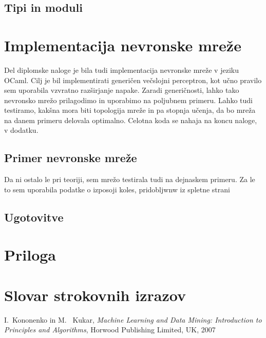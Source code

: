 \documentclass[mat1]{fmfdelo}
\begin{document}
\subsection{Tipi in moduli}


\section{Implementacija nevronske mreže}
Del diplomske naloge je bila tudi implementacija nevronske mreže v jeziku OCaml. Cilj je bil implementirati generičen večslojni perceptron, kot učno pravilo sem uporabila vzvratno razširjanje napake. Zaradi generičnosti, lahko tako nevronsko mrežo prilagodimo in uporabimo na poljubnem primeru. Lahko tudi testiramo, kakšna mora biti topologija mreže in pa stopnja učenja, da bo mreža na danem primeru delovala optimalno. Celotna koda se nahaja na koncu naloge, v dodatku.

\subsection{Primer nevronske mreže}
Da ni ostalo le pri teoriji, sem mrežo testirala tudi na dejnaskem primeru. Za le to sem uporabila podatke o izposoji koles, pridobljwnw iz spletne strani %

\subsection{Ugotovitve}

\section{Priloga} 

\section*{Slovar strokovnih izrazov}

\geslo{}{}
\geslo{}{}

\begin{thebibliography}{99}

I.~Kononenko in M.~ Kukar, \emph{Machine Learning and Data Mining: Introduction to Principles and Algorithms}, Horwood Publishing Limited, UK, 2007



\end{thebibliography}
\end{document}
